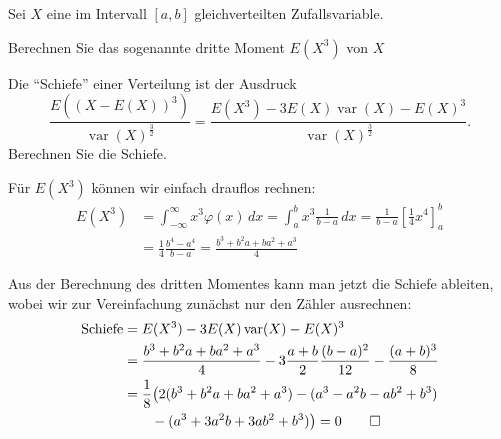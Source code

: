 Sei $X$ eine im Intervall $[a,b]$ gleichverteilten Zufallsvariable.
\begin{teilaufgaben}
\item Berechnen Sie das sogenannte dritte Moment $E(X^3)$ von $X$
\item Die ``Schiefe'' einer Verteilung ist der Ausdruck
\[
\frac{E((X-E(X))^3)}{\operatorname{var}(X)^{\frac32}}
=
\frac{E(X^3)-3E(X)\operatorname{var}(X)-E(X)^3}{\operatorname{var}(X)^{\frac32}}.
\]
Berechnen Sie die Schiefe.
\end{teilaufgaben}


\begin{loesung}
\begin{teilaufgaben}
\item
Für $E(X^3)$ können wir einfach drauflos rechnen:
\begin{align*}
E(X^3)
&=
\int_{-\infty}^\infty x^3\varphi(x)\,dx
=
\int_a^bx^3\frac1{b-a}\,dx
=
\frac1{b-a}\left[\frac14x^4\right]_a^b
\\
&=
\frac14\frac{b^4-a^4}{b-a}
=
\frac{b^3+b^2a+ba^2+a^3}{4}
\end{align*}
\item Aus der Berechnung des dritten Momentes kann man jetzt
die Schiefe ableiten, wobei wir zur Vereinfachung zunächst
nur den Zähler ausrechnen:
\begin{align*}
\text{Schiefe}
&=
E(X^3)-3E(X)\operatorname{var}(X)-E(X)^3
\\
&=
\frac{b^3+b^2a+ba^2+a^3}{4}
-3\frac{a+b}2\frac{(b-a)^2}{12}
-\frac{(a+b)^3}{8}
\\
&=
\frac18\bigl(
2(b^3+b^2a+ba^2+a^3)
-(a^3-a^2b-ab^2+b^3)
\\
&\qquad
-(a^3+3a^2b+3ab^2+b^3)
\bigr)
=0
\qedhere
\end{align*}
\end{teilaufgaben}
\end{loesung}

